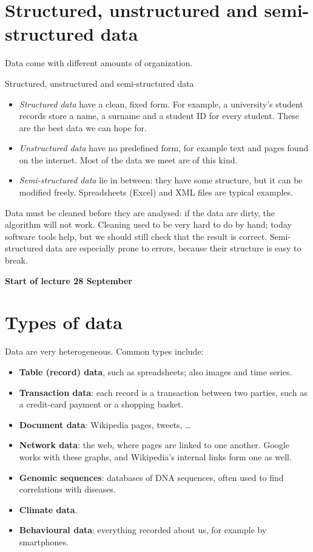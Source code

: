 \documentclass[a4paper,12pt,oneside]{report}
\newcommand{\lecturebanner}[1]{%
  \Needspace{6\baselineskip}%
  \begin{tcolorbox}[colback=yellow!20,colframe=yellow!60!black,
    boxrule=0.4pt,arc=1mm,left=5pt,right=5pt,top=3pt,bottom=3pt,
    before skip=6pt,after skip=6pt]
  \small\textbf{#1}
  \end{tcolorbox}}
\newcommand{\lecturestart}[1]{\lecturebanner{Start of lecture #1}}
\begin{document}
\section{Structured, unstructured and semi-structured data}

Data come with different amounts of organization.

\begin{frameddefn}{Structured, unstructured and semi-structured data}
\label{def:data-structure-levels}
\begin{itemize}
  \item \emph{Structured data} have a clean, fixed form. For example,
    a university's student records store a name, a surname and a
    student ID for every student. These are the best data we can hope
    for.
  \item \emph{Unstructured data} have no predefined form, for example
    text and pages found on the internet. Most of the data we meet are
    of this kind.
  \item \emph{Semi-structured data} lie in between: they have some
    structure, but it can be modified freely. Spreadsheets (Excel) and
    XML files are typical examples.
\end{itemize}
\end{frameddefn}

\begin{notebox}
Data must be cleaned before they are analysed: if the data are dirty,
the algorithm will not work. Cleaning used to be very hard to do by
hand; today software tools help, but we should still check that the
result is correct. Semi-structured data are especially prone to errors,
because their structure is easy to break.
\end{notebox}

\lecturestart{28 September}

\section{Types of data}

Data are very heterogeneous. Common types include:
\begin{itemize}
  \item \textbf{Table (record) data}, such as spreadsheets; also images
    and time series.
  \item \textbf{Transaction data}: each record is a transaction between
    two parties, such as a credit-card payment or a shopping basket.
  \item \textbf{Document data}: Wikipedia pages, tweets, \ldots
  \item \textbf{Network data}: the web, where pages are linked to one
    another. Google works with these graphs, and Wikipedia's internal
    links form one as well.
  \item \textbf{Genomic sequences}: databases of DNA sequences, often
    used to find correlations with diseases.
  \item \textbf{Climate data}.
  \item \textbf{Behavioural data}: everything recorded about us, for
    example by smartphones.
\end{itemize}
\end{document}
